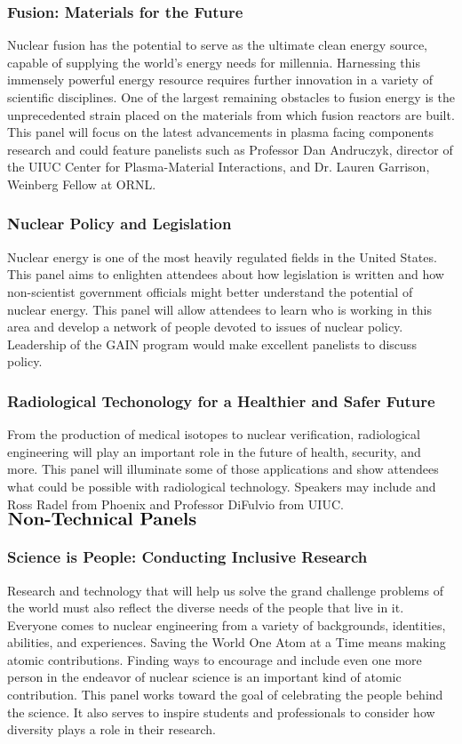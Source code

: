 \subsubsection{Fusion: Materials for the Future}
Nuclear fusion has the potential to serve as the ultimate clean energy source, capable of supplying the world’s energy needs for millennia. Harnessing this immensely powerful energy resource requires further innovation in a variety of scientific disciplines. One of the largest remaining obstacles to fusion energy is the unprecedented strain placed on the materials from which fusion reactors are built. This panel will focus on the latest advancements in plasma facing components research and could feature panelists such as Professor Dan Andruczyk, director of the UIUC Center for Plasma-Material Interactions, and Dr. Lauren Garrison, Weinberg Fellow at ORNL.

\subsubsection{Nuclear Policy and Legislation}
Nuclear energy is one of the most heavily regulated fields in the United States. This panel aims to enlighten attendees about how legislation is written and how non-scientist government officials might better understand the potential of nuclear energy. This panel will allow attendees to learn who is working in this area and develop a network of people devoted to issues of nuclear policy. Leadership of the GAIN program would make excellent panelists to discuss policy.

\subsubsection{Radiological Techonology for a Healthier and Safer Future}
From the production of medical isotopes to nuclear verification, radiological engineering will play an important role in the future of health, security, and more. This panel will illuminate some of those applications and show attendees what could be possible with radiological technology. Speakers may include and Ross Radel from Phoenix and Professor DiFulvio from UIUC.\\

$\Large\textbf{Non-Technical Panels}$

\subsubsection{Science is People: Conducting Inclusive Research}
Research and technology that will help us solve the grand challenge problems of the world must also reflect the diverse needs of the people that live in it. Everyone comes to nuclear engineering from a variety of backgrounds, identities, abilities, and experiences. Saving the World One Atom at a Time means making atomic contributions. Finding ways to encourage and include even one more person in the endeavor of nuclear science is an important kind of atomic contribution. This panel works toward the goal of celebrating the people behind the science. It also serves to inspire students and professionals to consider how diversity plays a role in their research.


